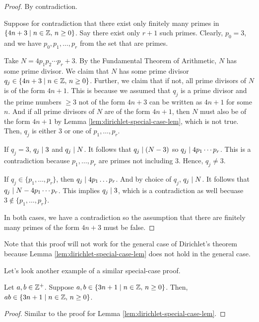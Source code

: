 \begin{proof}
    By contradiction.

    Suppose for contradiction that there exist only finitely many primes in $\{ 4n+3 \mid n \in \mathbb{Z},\, n \geq 0\}$. Say there exist only $r+1$ such primes. Clearly, $p_0 = 3$, and we have $p_0,p_1,\ldots,p_r$ from the set that are primes.

    Take $N = 4p_1p_2\cdots p_r + 3$. By the Fundamental Theorem of Arithmetic, $N$ has some prime divisor. We claim that $N$ has some prime divisor $q_j \in \{4n+3 \mid n\in \mathbb{Z},\, n \geq 0\}$. Further, we claim that if not, all prime divisors of $N$ is of the form $4n + 1$. This is because we assumed that $q_j$ is a prime divisor and the prime numbers $\geq 3$ not of the form $4n + 3$ can be written as $4n + 1$ for some $n$. And if all prime divisors of $N$ are of the form $4n+1$, then $N$ must also be of the form $4n + 1$ by Lemma \ref{lem:dirichlet-special-case-lem}, which is not true. Then, $q_j$ is either 3 or one of $p_1,\ldots,p_r$.

    If $q_j = 3$, $q_j \mathrel{\mid} 3$ and $q_j \mathrel{\mid} N$. It follows that $q_j \mathrel{\mid} (N-3)$ so $q_j \mathrel{\mid} 4 p_1\cdots p_r$. This is a contradiction because $p_1,\ldots,p_r$ are primes not including 3. Hence, $q_j \neq 3$.

    If $q_j \in \{p_1,\ldots,p_r\}$, then $q_j \mathrel{\mid} 4p_1\ldots p_r$. And by choice of $q_j$, $q_j \mathrel{\mid} N$. It follows that $q_j \mathrel{\mid} N - 4p_1\cdots p_r$. This implies $q_j \mathrel{\mid} 3$, which is a contradiction as well becuase $3 \not\in \{p_1,\ldots,p_r\}$.

    In both cases, we have a contradiction so the assumption that there are finitely many primes of the form $4n + 3$ must be false.
\end{proof}

Note that this proof will not work for the general case of Dirichlet's theorem because Lemma \ref{lem:dirichlet-special-case-lem} does not hold in the general case.

Let's look another example of a similar special-case proof.

\begin{lemma}
    Let $a,b \in \mathbb{Z}^+$. Suppose $a,b \in \{3n+1 \mid n \in \mathbb{Z},\, n \geq 0\}$. Then, $ab \in \{3n+1 \mid n \in \mathbb{Z},\, n \geq 0\}$.
\end{lemma}

\begin{proof}
    Similar to the proof for Lemma \ref{lem:dirichlet-special-case-lem}.
\end{proof}

